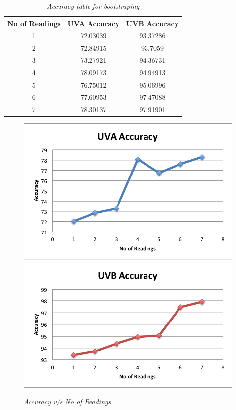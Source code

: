 \documentclass[10pt]{sigplan-proc-varsize}
\begin{document}
\begin{table}[h]
\centering
\begin{tabular}{|c|c|c|}
\hline
No of Readings & UVA Accuracy & UVB Accuracy \\
\hline 
1 & 72.03039 & 93.37286\\
\hline
2 & 72.84915 & 93.7059 \\
\hline
3 & 73.27921	& 94.36731\\
\hline
4 & 78.09173	& 94.94913\\
\hline
5 & 76.75012 & 95.06996 \\
\hline
6 & 77.60953 & 97.47088 \\
\hline
7 & 78.30137 & 97.91901\\
\hline
\end{tabular}
\caption{\small \sl Accuracy table for bootstraping}
\end{table}
\begin{figure}[h]
\begin{center}
\includegraphics[scale=0.4]{uvaAccuracy.png}
\includegraphics[scale=0.4]{uvbAccuracy.png}
\caption{\small \sl Accuracy v/s No of Readings}
\label{fig:lessReadings}
\end{center}
\end{figure}
\end{document}
